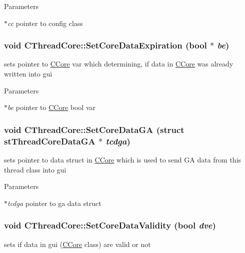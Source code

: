 \begin{DoxyParams}{Parameters}
\item[{\em $\ast$cc}]pointer to config class \end{DoxyParams}
\hypertarget{classCThreadCore_a12e9d20ea581f945c72e6648a313e3b3}{
\subsubsection[{SetCoreDataExpiration}]{\setlength{\rightskip}{0pt plus 5cm}void CThreadCore::SetCoreDataExpiration (bool $\ast$ {\em be})}}
\label{classCThreadCore_a12e9d20ea581f945c72e6648a313e3b3}
sets pointer to \hyperlink{classCCore}{CCore} var which determining, if data in \hyperlink{classCCore}{CCore} was already written into gui


\begin{DoxyParams}{Parameters}
\item[{\em $\ast$be}]pointer to \hyperlink{classCCore}{CCore} bool var \end{DoxyParams}
\hypertarget{classCThreadCore_a21b99b77c6e6f2ba8c3616c82185d6ef}{
\subsubsection[{SetCoreDataGA}]{\setlength{\rightskip}{0pt plus 5cm}void CThreadCore::SetCoreDataGA (struct {\bf stThreadCoreDataGA} $\ast$ {\em tcdga})}}
\label{classCThreadCore_a21b99b77c6e6f2ba8c3616c82185d6ef}
sets pointer to data struct in \hyperlink{classCCore}{CCore} which is used to send GA data from this thread class into gui


\begin{DoxyParams}{Parameters}
\item[{\em $\ast$tcdga}]pointer to ga data struct \end{DoxyParams}
\hypertarget{classCThreadCore_a780fc802d644b0e4d992558df2f27c5d}{
\subsubsection[{SetCoreDataValidity}]{\setlength{\rightskip}{0pt plus 5cm}void CThreadCore::SetCoreDataValidity (bool {\em dve})}}
\label{classCThreadCore_a780fc802d644b0e4d992558df2f27c5d}
sets if data in gui (\hyperlink{classCCore}{CCore} class) are valid or not



